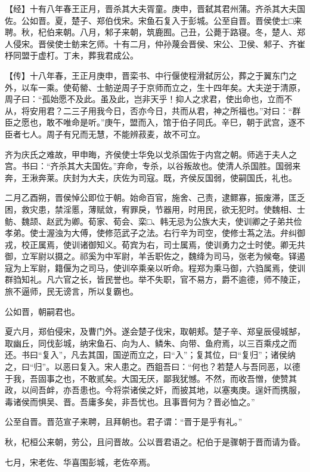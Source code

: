 \documentclass[]{article}
\begin{document}
【经】十有八年春王正月，晋杀其大夫胥童。庚申，晋弑其君州蒲。齐杀其大夫国佐。公如晋。夏，楚子、郑伯伐宋。宋鱼石复入于彭城。公至自晋。晋侯使士□来聘。秋，杞伯来朝。八月，邾子来朝，筑鹿囿。己丑，公薨于路寝。冬，楚人、郑人侵宋。晋侯使士鲂来乞师。十有二月，仲孙蔑会晋侯、宋公、卫侯、邾子、齐崔杼同盟于虚朾。丁未，葬我君成公。

【传】十八年春，王正月庚申，晋栾书、中行偃使程滑弑厉公，葬之于翼东门之外，以车一乘。使荀罃、士鲂逆周子于京师而立之，生十四年矣。大夫逆于清原，周子曰：``孤始愿不及此。虽及此，岂非天乎！抑人之求君，使出命也，立而不从，将安用君？二三子用我今日，否亦今日，共而从君，神之所福也。''对曰：``群臣之愿也，敢不唯命是听。''庚午，盟而入，馆于伯子同氏。辛巳，朝于武宫，逐不臣者七人。周子有兄而无慧，不能辨菽麦，故不可立。

齐为庆氏之难故，甲申晦，齐侯使士华免以戈杀国佐于内宫之朝。师逃于夫人之宫。书曰：``齐杀其大夫国佐。''弃命，专杀，以谷叛故也。使清人杀国胜。国弱来奔，王湫奔莱。庆封为大夫，庆佐为司寇。既，齐侯反国弱，使嗣国氏，礼也。

二月乙酉朔，晋侯悼公即位于朝。始命百官，施舍、己责，逮鳏寡，振废滞，匡乏困，救灾患，禁淫慝，薄赋敛，宥罪戾，节器用，时用民，欲无犯时。使魏相、士鲂、魏颉、赵武为卿。荀家、荀会、栾□、韩无忌为公族大夫，使训卿之子弟共俭孝弟。使士渥浊为大傅，使修范武子之法。右行辛为司空，使修士蒍之法。弁纠御戎，校正属焉，使训诸御知义。荀宾为右，司士属焉，使训勇力之士时使。卿无共御，立军尉以摄之。祁奚为中军尉，羊舌职佐之，魏绛为司马，张老为候奄。铎遏寇为上军尉，籍偃为之司马，使训卒乘亲以听命。程郑为乘马御，六驺属焉，使训群驺知礼。凡六官之长，皆民誉也。举不失职，官不易方，爵不逾德，师不陵正，旅不逼师，民无谤言，所以复霸也。

公如晋，朝嗣君也。

夏六月，郑伯侵宋，及曹门外。遂会楚子伐宋，取朝郏。楚子辛、郑皇辰侵城郜，取幽丘，同伐彭城，纳宋鱼石、向为人、鳞朱、向带、鱼府焉，以三百乘戍之而还。书曰``复入''，凡去其国，国逆而立之，曰``入''；复其位，曰``复归''；诸侯纳之，曰``归''。以恶曰复入。宋人患之。西鉏吾曰：``何也？若楚人与吾同恶，以德于我，吾固事之也，不敢贰矣。大国无厌，鄙我犹憾。不然，而收吾憎，使赞其政，以间吾衅，亦吾患也。今将崇诸侯之奸，而披其地，以塞夷庚。逞奸而携服，毒诸侯而惧吴、晋。吾庸多矣，非吾忧也。且事晋何为？晋必恤之。''

公至自晋。晋范宣子来聘，且拜朝也。君子谓：``晋于是乎有礼。''

秋，杞桓公来朝，劳公，且问晋故。公以晋君语之。杞伯于是骤朝于晋而请为昏。

七月，宋老佐、华喜围彭城，老佐卒焉。
\end{document}
